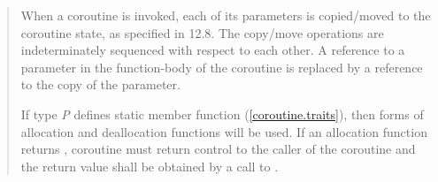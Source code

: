 \begin{quote}

\pnum
When a coroutine is invoked, each of its parameters is copied/moved to the coroutine state, as specified in 12.8.  The copy/move operations are indeterminately sequenced with respect to each other.
A reference to a parameter in the function-body of the coroutine is replaced by a reference to the copy of the parameter.

%
%






\pnum
If type \textit{P} defines static member function  (\ref{coroutine.traits}), then  forms of allocation and deallocation functions will be used. If an allocation function returns , coroutine must return control to the caller of the coroutine and the return value shall be obtained by a call to .


\end{quote}

